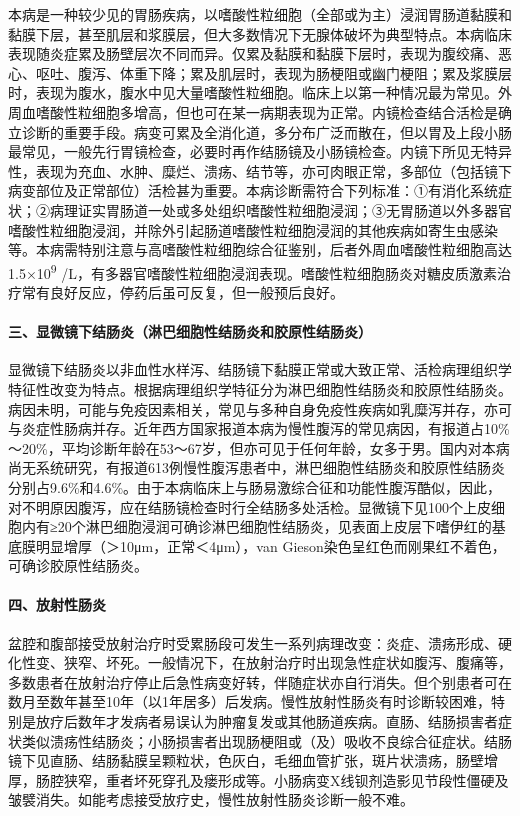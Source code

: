 本病是一种较少见的胃肠疾病，以嗜酸性粒细胞（全部或为主）浸润胃肠道黏膜和黏膜下层，甚至肌层和浆膜层，但大多数情况下无腺体破坏为典型特点。本病临床表现随炎症累及肠壁层次不同而异。仅累及黏膜和黏膜下层时，表现为腹绞痛、恶心、呕吐、腹泻、体重下降；累及肌层时，表现为肠梗阻或幽门梗阻；累及浆膜层时，表现为腹水，腹水中见大量嗜酸性粒细胞。临床上以第一种情况最为常见。外周血嗜酸性粒细胞多增高，但也可在某一病期表现为正常。内镜检查结合活检是确立诊断的重要手段。病变可累及全消化道，多分布广泛而散在，但以胃及上段小肠最常见，一般先行胃镜检查，必要时再作结肠镜及小肠镜检查。内镜下所见无特异性，表现为充血、水肿、糜烂、溃疡、结节等，亦可肉眼正常，多部位（包括镜下病变部位及正常部位）活检甚为重要。本病诊断需符合下列标准：①有消化系统症状；②病理证实胃肠道一处或多处组织嗜酸性粒细胞浸润；③无胃肠道以外多器官嗜酸性粒细胞浸润，并除外引起肠道嗜酸性粒细胞浸润的其他疾病如寄生虫感染等。本病需特别注意与高嗜酸性粒细胞综合征鉴别，后者外周血嗜酸性粒细胞高达1.5×10\textsuperscript{9}
/L，有多器官嗜酸性粒细胞浸润表现。嗜酸性粒细胞肠炎对糖皮质激素治疗常有良好反应，停药后虽可反复，但一般预后良好。

\paragraph{三、显微镜下结肠炎（淋巴细胞性结肠炎和胶原性结肠炎）}

显微镜下结肠炎以非血性水样泻、结肠镜下黏膜正常或大致正常、活检病理组织学特征性改变为特点。根据病理组织学特征分为淋巴细胞性结肠炎和胶原性结肠炎。病因未明，可能与免疫因素相关，常见与多种自身免疫性疾病如乳糜泻并存，亦可与炎症性肠病并存。近年西方国家报道本病为慢性腹泻的常见病因，有报道占10\%～20\%，平均诊断年龄在53～67岁，但亦可见于任何年龄，女多于男。国内对本病尚无系统研究，有报道613例慢性腹泻患者中，淋巴细胞性结肠炎和胶原性结肠炎分别占9.6\%和4.6\%。由于本病临床上与肠易激综合征和功能性腹泻酷似，因此，对不明原因腹泻，应在结肠镜检查时行全结肠多处活检。显微镜下见100个上皮细胞内有≥20个淋巴细胞浸润可确诊淋巴细胞性结肠炎，见表面上皮层下嗜伊红的基底膜明显增厚（＞10μm，正常＜4μm），van
Gieson染色呈红色而刚果红不着色，可确诊胶原性结肠炎。

\paragraph{四、放射性肠炎}

盆腔和腹部接受放射治疗时受累肠段可发生一系列病理改变：炎症、溃疡形成、硬化性变、狭窄、坏死。一般情况下，在放射治疗时出现急性症状如腹泻、腹痛等，多数患者在放射治疗停止后急性病变好转，伴随症状亦自行消失。但个别患者可在数月至数年甚至10年（以1年居多）后发病。慢性放射性肠炎有时诊断较困难，特别是放疗后数年才发病者易误认为肿瘤复发或其他肠道疾病。直肠、结肠损害者症状类似溃疡性结肠炎；小肠损害者出现肠梗阻或（及）吸收不良综合征症状。结肠镜下见直肠、结肠黏膜呈颗粒状，色灰白，毛细血管扩张，斑片状溃疡，肠壁增厚，肠腔狭窄，重者坏死穿孔及瘘形成等。小肠病变X线钡剂造影见节段性僵硬及皱襞消失。如能考虑接受放疗史，慢性放射性肠炎诊断一般不难。

